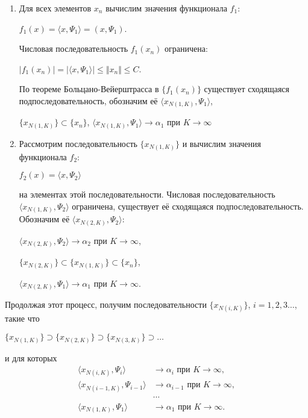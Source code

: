 \documentclass[12pt,a4paper,titlepage,oneside]{book}
\theoremstyle{definition}
\theoremstyle{plain}
\theoremstyle{remark}
\theoremstyle{remark}
\theoremstyle{remark}
\theoremstyle{remark}
\theoremstyle{plain}
\theoremstyle{plain}
\begin{document}
\begin{enumerate}
\item Для всех элементов $x_n$ вычислим значения функционала $f_1$:

\begin{center}
$f_1(x)= \langle x,\Psi_1 \rangle =(x,\Psi_1)$.
\end{center}
Числовая последовательность $f_1(x_n)$ ограничена:
\begin{center}
$\vert f_1(x_n)\vert = \vert \langle x,\Psi_1 \rangle \vert \leqslant \Vert x_n\Vert \leqslant C$.
\end{center}
По теореме Больцано-Вейерштрасса в $\lbrace f_1(x_n) \rbrace$ существует сходящаяся подпоследовательность, обозначим её 
$ \langle x_{N(1,K)},\Psi_1 \rangle $,
\begin{center}
$\lbrace x_{N(1,K)} \rbrace \subset
 \lbrace x_n \rbrace$, $ \langle x_{N(1,K)},\Psi_1 \rangle  \to \alpha_1$ при $K\to\infty$
\end{center}

\item Рассмотрим последовательность $\lbrace x_{N(1,K)} \rbrace$ и вычислим значения функционала $f_2$:
\begin{center}
$f_2(x)= \langle x,\Psi_2 \rangle $ 
\end{center}
на элементах этой последовательности. Числовая последовательность $  \langle  x_{N(1,K)},\Psi_2 \rangle $ ограничена, существует её сходящаяся подпоследовательность. Обозначим её 
$ \langle x_{N(2,K)},\Psi_2 \rangle $:
\begin{center}
$ \langle x_{N(2,K)},\Psi_2 \rangle  \to \alpha_2$ при
 $K\to\infty$, 
 \end{center}
 \begin{center}
$\lbrace x_{N(2,K)} \rbrace \subset 
\lbrace x_{N(1,K)} \rbrace \subset 
 \lbrace x_n \rbrace$,
  \end{center}
 \begin{center}
 $ \langle x_{N(2,K)},\Psi_1 \rangle  \to \alpha_1$ при
 $K\to\infty$. 
\end{center}
\end{enumerate}
Продолжая этот процесс, получим последовательности 
$\lbrace x_{N(i,K)} \rbrace$, $i=1,2,3\ldots$, такие что 
 \begin{center}
 $\lbrace x_{N(1,K)} \rbrace \supset
\lbrace x_{N(2,K)} \rbrace \supset
\lbrace x_{N(3,K)} \rbrace \supset \ldots$
\end{center}
и для которых
\begin{align*}
\langle x_{N(i,K)},\Psi_i \rangle &\to \alpha_i \mbox{ при } K\to\infty,\\
\langle x_{N(i-1,K)},\Psi_{i-1} \rangle &\to \alpha_{i-1} \mbox{ при } K\to\infty,\\
&\cdots\\
\langle x_{N(1,K)},\Psi_{1} \rangle &\to \alpha_{1} \mbox{ при } K\to\infty.
\end{align*}
\end{document}
